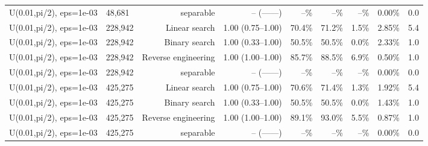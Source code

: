 \begin{tabular}{llrrrrrrr}
U(0.01,pi/2), eps=1e-03 & 48,681 & separable & -- (------) & --\% & --\% & --\% & 0.00\% & 0.0 \\
U(0.01,pi/2), eps=1e-03 & 228,942 & Linear search & 1.00 (0.75--1.00) & 70.4\% & 71.2\% & 1.5\% & 2.85\% & 5.4 \\
U(0.01,pi/2), eps=1e-03 & 228,942 & Binary search & 1.00 (0.33--1.00) & 50.5\% & 50.5\% & 0.0\% & 2.33\% & 1.0 \\
U(0.01,pi/2), eps=1e-03 & 228,942 & Reverse engineering & 1.00 (1.00--1.00) & 85.7\% & 88.5\% & 6.9\% & 0.50\% & 1.0 \\
U(0.01,pi/2), eps=1e-03 & 228,942 & separable & -- (------) & --\% & --\% & --\% & 0.00\% & 0.0 \\
U(0.01,pi/2), eps=1e-03 & 425,275 & Linear search & 1.00 (0.75--1.00) & 70.6\% & 71.4\% & 1.3\% & 1.92\% & 5.4 \\
U(0.01,pi/2), eps=1e-03 & 425,275 & Binary search & 1.00 (0.33--1.00) & 50.5\% & 50.5\% & 0.0\% & 1.43\% & 1.0 \\
U(0.01,pi/2), eps=1e-03 & 425,275 & Reverse engineering & 1.00 (1.00--1.00) & 89.1\% & 93.0\% & 5.5\% & 0.87\% & 1.0 \\
U(0.01,pi/2), eps=1e-03 & 425,275 & separable & -- (------) & --\% & --\% & --\% & 0.00\% & 0.0 \\
\bottomrule
\end{tabular}
